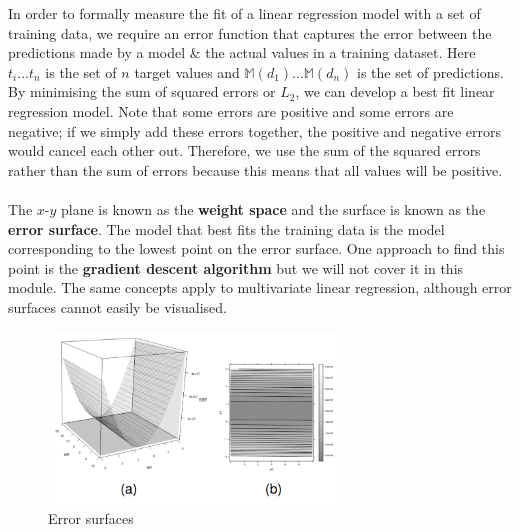 \documentclass[a4paper,11pt]{article}
\begin{document}
In order to formally measure the fit of a linear regression model with a set of training data, we require an error function that captures the error between the predictions made by a model \& the actual values in a training dataset.
Here $t_i \dots t_n$ is the set of $n$ target values and $\mathbb{M}(d_1) \dots \mathbb{M}(d_n)$ is the set of predictions.
By minimising the sum of squared errors or $L_2$, we can develop a best fit linear regression model.
Note that some errors are positive and some errors are negative; if we simply add these errors together, the positive and negative errors would cancel each other out.
Therefore, we use the sum of the squared errors rather than the sum of errors because this means that all values will be positive.
\\\\
The $x$-$y$ plane is known as the \textbf{weight space} and the surface is known as the \textbf{error surface}.
The model that best fits the training data is the model corresponding to the lowest point on the error surface.
One approach to find this point is the \textbf{gradient descent algorithm} but we will not cover it in this module.
The same concepts apply to multivariate linear regression, although error surfaces cannot easily be visualised.

\begin{figure}[H]
    \centering
    \includegraphics[width=0.7\textwidth]{images/errorsurfaces.png}
    \caption{ Error surfaces }
\end{figure}
\end{document}
